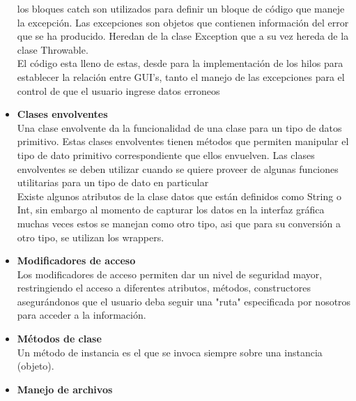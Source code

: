 \documentclass[a4paper,12pt]{article}
\begin{document}
\begin{flushleft}
\begin{itemize}
{los bloques catch son utilizados para definir un bloque de código que maneje la excepción. Las excepciones son objetos que contienen información del error que se ha producido. Heredan de la clase Exception que a su vez hereda de la clase Throwable.\\\vspace{0.3cm}El código esta lleno de estas, desde para la implementación de los hilos para establecer la relación entre GUI's, tanto el manejo de las excepciones para el control de que el usuario ingrese datos erroneos\\\vspace{0.3cm}}
\item{\textbf{Clases envolventes}}
\vspace{0.3cm}
\textsf{\\Una clase envolvente da la funcionalidad de una clase para un tipo de datos primitivo. Estas clases envolventes tienen métodos que permiten manipular el tipo de dato primitivo correspondiente que ellos envuelven. Las clases envolventes se deben utilizar cuando  se quiere proveer de algunas funciones utilitarias para un tipo de dato en particular\\\vspace{0.3cm}Existe algunos atributos de la clase datos que están definidos como String o Int, sin embargo al momento de capturar los datos en la interfaz gráfica muchas veces estos se manejan como otro tipo, asi que para su conversión a otro tipo, se utilizan los wrappers.}
\item{\textbf{Modificadores de acceso}}
\vspace{0.3cm}
\textsf{\\Los modificadores de acceso permiten dar un nivel de seguridad mayor, restringiendo el acceso a diferentes atributos, métodos, constructores asegurándonos que el usuario deba seguir una "ruta" especificada por nosotros para acceder a la información.}
\item{\textbf{Métodos de clase}}
\vspace{0.3cm}
\textsf{\\Un método de instancia es el que se invoca siempre sobre una instancia (objeto).}
\item{\textbf{Manejo de archivos}}
\vspace{0.3cm}

\end{itemize}
\end{flushleft}
\end{document}
